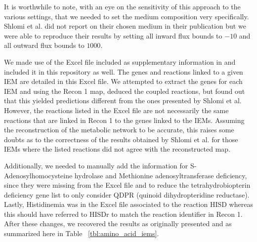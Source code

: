 \documentclass[10pt,a4paper,onecolumn]{article}
\begin{document}
It is worthwhile to note, with an eye on the sensitivity of this
approach to the various settings, that we needed to set the medium
composition very specifically. Shlomi et al. did not report on their
chosen medium in their publication but we were able to reproduce their
results by setting all inward flux bounds to \(-10\) and all outward
flux bounds to \(1000\).

We made use of the Excel file included as supplementary information in
\autocite{Shlomi2009} and included it in this repository as well. The
genes and reactions linked to a given IEM are detailed in this Excel
file. We attempted to extract the genes for each IEM and using the Recon
1 map, deduced the coupled reactions, but found out that this yielded
predictions different from the ones presented by Shlomi et al. However,
the reactions listed in the Excel file are not necessarily the same
reactions that are linked in Recon 1 to the genes linked to the IEMs.
Assuming the reconstruction of the metabolic network to be accurate,
this raises some doubts as to the correctness of the results obtained by
Shlomi et al. for those IEMs where the listed reactions did not agree
with the reconstructed map.

Additionally, we needed to manually add the information for
S-Adenosylhomocysteine hydrolase and Methionine adenosyltransferase
deficiency, since they were missing from the Excel file and to reduce
the tetrahydrobiopterin deficiency gene list to only consider QDPR
(quinoid dihydropteridine reductase). Lastly, Histidinemia was in the
Excel file associated to the reaction HISD whereas this should have
referred to HISDr to match the reaction identifier in Recon 1. After
these changes, we recovered the results as originally presented and as
summarized here in Table ~\ref{tbl:amino_acid_iems}.
\end{document}
